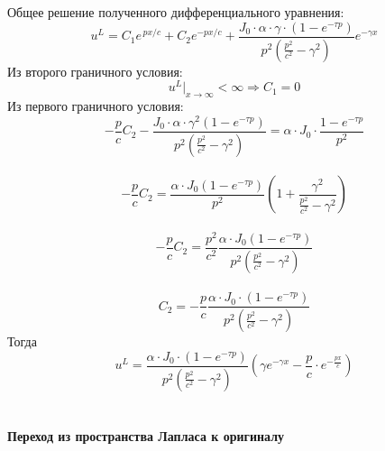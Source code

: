 \documentclass[a4paper, 11pt]{article}
\newcommand{\beq}{\begin{equation}}
\newcommand{\eeq}{\end{equation}}
\newenvironment{solution}
    {\textit{}}
    {}
\begin{document}
\begin{solution}
Общее решение полученного дифференциального уравнения:
\beq
u^L=C_1e^{\,px/c}+C_2e^{-px/c}+\frac{J_0\cdot\alpha\cdot\gamma\cdot\left(1-e^{-\tau p}\right)}{p^2\left(\frac{p^2}{c^2}-\gamma^2\right)}e^{-\gamma x}
\eeq
Из второго граничного условия:
\beq
u^L|_{x\rightarrow\infty}<\infty \Rightarrow C_1=0
\eeq
Из первого граничного условия:
\beq
-\frac{p}{c}C_2-\frac{J_0\cdot\alpha\cdot\gamma^2\left(1-e^{-\tau p}\right)}{p^2\left(\frac{p^2}{c^2}-\gamma^2\right)}=\alpha\cdot J_0\cdot\frac{1-e^{-\tau p}}{p^2}
\eeq
\\
\beq
-\frac{p}{c}C_2=\frac{\alpha\cdot J_0\left(1-e^{-\tau p}\right)}{p^2}\left(1+\frac{\gamma^2}{\frac{p^2}{c^2}-\gamma^2}\right)
\eeq
\\
\beq
-\frac{p}{c}C_2=\frac{p^2}{c^2}\frac{\alpha\cdot J_0\left(1-e^{-\tau p}\right)}{p^2\left(\frac{p^2}{c^2}-\gamma^2\right)}
\eeq
\\
\beq
C_2=-\frac{p}{c}\frac{\alpha\cdot J_0\cdot\left(1-e^{-\tau p}\right)}{p^2\left(\frac{p^2}{c^2}-\gamma^2\right)}
\eeq
\end{solution}
Тогда
\beq
u^L=\frac{\alpha\cdot J_0\cdot\left(1-e^{-\tau p}\right)}{p^2\left(\frac{p^2}{c^2}-\gamma^2\right)}\left(\gamma e^{-\gamma x}-\frac{p}{c}\cdot e^{-\frac{px}{c}}\right)
\eeq
\\\\
\textbf{Переход из пространства Лапласа к оригиналу}\\
\end{document}
